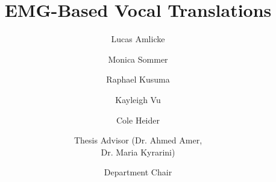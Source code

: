 \documentclass{scu-thesis}
\author{Lucas Amlicke}
\author{Monica Sommer}
\author{Raphael Kusuma}
\author{Kayleigh Vu}
\author{Cole Heider}
\title{EMG-Based Vocal Translations}
\begin{document}
\frontmatter{}
\signature{Thesis Advisor (Dr. Ahmed Amer,\\ Dr. Maria Kyrarini)}


\signature{Department Chair}



\tableofcontents
\listoffigures

\mainmatter













\backmatter
\end{document}
